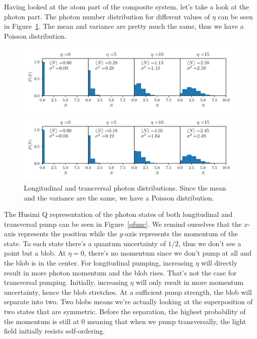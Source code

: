 \noindent Having looked at the atom part of the composite system, let's take a look at the photon part. The photon number distribution for different values of $\eta$ can be seen in Figure~\ref{photon_dist}. The mean and variance are pretty much the same, thus we have a Poisson distribution.

\begin{figure}[!htb]
	\begin{minipage}[b]{1\linewidth}
	\centering
	\includegraphics[width=1\textwidth]{images/pho_dens_long.pdf}
	\end{minipage}
%
	\begin{minipage}[b]{1\linewidth}
	\centering
	\includegraphics[width=1\textwidth]{images/pho_dens_trans.pdf}
	\end{minipage}
\caption{Longitudinal and transversal photon distributions. Since the mean and the variance are the same, we have a Poisson distribution.}
\label{photon_dist}
\end{figure}
\FloatBarrier

\noindent The Husimi Q representation of the photon states of both longitudinal and transversal pump can be seen in Figure~\ref{qfunc}. We remind ourselves that the $x$-axis represents the position while the $y$-axis represents the momentum of the state. To each state there's a quantum uncertainty of $1/2$, thus we don't see a point but a blob. At $\eta = 0$, there's no momentum since we don't pump at all and the blob is in the center. For longitudinal pumping, increasing $\eta$ will directly result in more photon momentum and the blob rises. That's not the case for transversal pumping. Initially, increasing $\eta$ will only result in more momentum uncertainty, hence the blob stretches. At a sufficient pump strength, the blob will separate into two. Two blobs means we're actually looking at the superposition of two states that are symmetric. Before the separation, the highest probability of the momentum is still at 0 meaning that when we pump transversally, the light field initially resists self-ordering.


